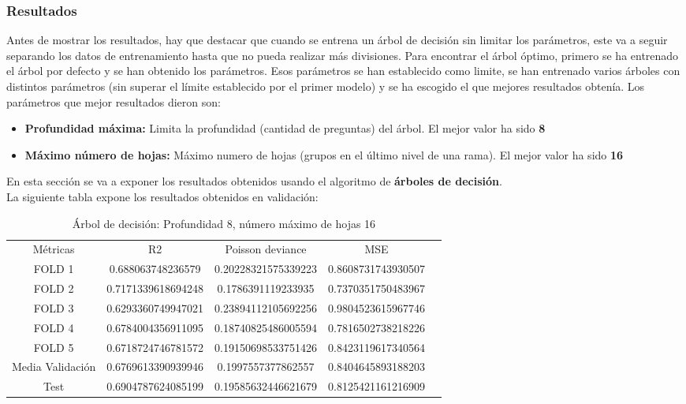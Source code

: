 \subsubsection{Resultados}
Antes de mostrar los resultados, hay que destacar que cuando se entrena un árbol de decisión sin limitar los parámetros, este va a seguir separando los datos de entrenamiento hasta que no pueda realizar más divisiones. Para encontrar el árbol óptimo, primero se ha entrenado el árbol por defecto y se han obtenido los parámetros. Esos parámetros se han establecido como limite, se han entrenado varios árboles con distintos parámetros (sin superar el límite establecido por el primer modelo) y se ha escogido el que mejores resultados obtenía. Los parámetros que mejor resultados dieron son: \\
\begin{itemize}
	\item \textbf{Profundidad máxima:} Limita la profundidad (cantidad de preguntas) del árbol. El mejor valor ha sido \textbf{8}
	\item \textbf{Máximo número de hojas:} Máximo numero de hojas (grupos en el último nivel de una rama). El mejor valor ha sido \textbf{16}
\end{itemize}
En esta sección se va a exponer los resultados obtenidos usando el algoritmo de \textbf{árboles de decisión}.\\
La siguiente tabla expone los resultados obtenidos en validación:
\begin{table}[htbp]
    \begin{tabular}{|c|c|c|c|c}
    \cline{1-4}
    Métricas         & R2                 & Poisson deviance    & MSE                  \\ \cline{1-4}
    FOLD 1           & 0.688063748236579  & 0.20228321575339223 & 0.8608731743930507   \\ \cline{1-4}
    FOLD 2           & 0.7171339618694248 & 0.1786391119233935  & 0.7370351750483967   \\ \cline{1-4}
    FOLD 3           & 0.6293360749947021 & 0.23894112105692256 & 0.9804523615967746   \\ \cline{1-4}
    FOLD 4           & 0.6784004356911095 & 0.18740825486005594 & 0.7816502738218226   \\ \cline{1-4}
    FOLD 5           & 0.6718724746781572 & 0.19150698533751426 & 0.8423119617340564   \\ \cline{1-4}
    Media Validación & 0.6769613390939946 & 0.1997557377862557  & 0.8404645893188203   \\  \cline{1-4}
    Test             & 0.6904787624085199 & 0.19585632446621679 & 0.8125421161216909   \\ \cline{1-4}
    \end{tabular}
	\caption{Árbol de decisión:  Profundidad 8, número máximo de hojas 16}
	\label{tab:tree_res}
\end{table}
